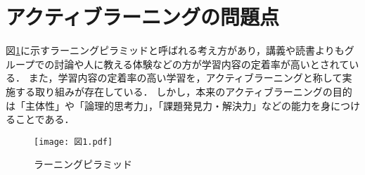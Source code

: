 \documentclass[twocolumn,10pt,a4j]{ltjsarticle}
\begin{document}
\section{アクティブラーニングの問題点}
図\ref{fig:ピラミッド}に示すラーニングピラミッドと呼ばれる考え方があり，講義や読書よりもグループでの討論や人に教える体験などの方が学習内容の定着率が高いとされている．
また，学習内容の定着率の高い学習を，アクティブラーニングと称して実施する取り組みが存在している．
しかし，本来のアクティブラーニングの目的は「主体性」や「論理的思考力」，「課題発見力・解決力」などの能力を身につけることである．

\begin{figure}[b]
\begin{center}
 \texttt{[image: 図1.pdf]}
\end{center}
 \caption{ラーニングピラミッド}
 \label{fig:ピラミッド}
\end{figure}
\end{document}
